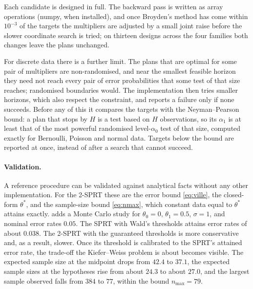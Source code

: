 \documentclass[11pt,a4paper]{article}
\theoremstyle{definition}
\theoremstyle{remark}
\begin{document}
Each candidate is designed in full. The backward pass is written as
array operations (numpy, when installed), and once Broyden's method has
come within $10^{-3}$ of the targets the multipliers are adjusted by a
small joint raise before the slower coordinate search is tried; on
thirteen designs across the four families both changes leave the plans
unchanged.

For discrete data there is a further limit. The plans that are optimal
for some pair of multipliers are non-randomised, and near the smallest
feasible horizon they need not reach every pair of error probabilities
that some test of that size reaches; randomised boundaries would. The
implementation then tries smaller horizons, which also respect the
constraint, and reports a failure only if none succeeds. Before any of
this it compares the targets with the Neyman--Pearson bound: a plan
that stops by $H$ is a test based on $H$ observations, so its
$\alpha_1$ is at least that of the most powerful randomised level-$\alpha_0$
test of that size, computed exactly for Bernoulli, Poisson and normal
data. Targets below the bound are reported at once, instead of after a
search that cannot succeed.

\paragraph{Validation.}
A reference procedure can be validated against analytical facts without
any other implementation. For the 2-SPRT these are the error bound
\eqref{eq:ville}, the closed-form $\theta^*$, and the sample-size bound
\eqref{eq:nmax}, which constant data equal to $\theta^*$ attains exactly.
 adds a Monte Carlo study for $\theta_0=0$, $\theta_1=0.5$,
$\sigma=1$, and nominal error rates $0.05$. The SPRT with Wald's
thresholds attains error rates of about $0.038$. The 2-SPRT with the
guaranteed thresholds is more conservative and, as a result, slower. Once
its threshold is calibrated to the SPRT's attained error rate, the
trade-off the Kiefer--Weiss problem is about becomes visible. The
expected sample size at the midpoint drops from $42.4$ to $37.1$, the
expected sample sizes at the hypotheses rise from about $24.3$ to about
$27.0$, and the largest sample observed falls from $384$ to $77$,
within the bound $n_{\max}=79$.
\end{document}
